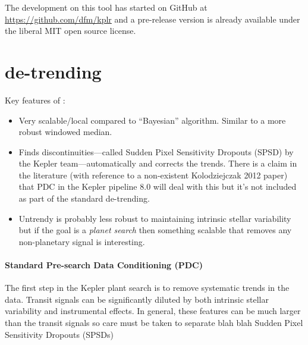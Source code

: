 \documentclass[letterpaper,12pt,preprint]{hack_aastex}
\begin{document}
The development on this tool has started on GitHub at
\url{https://github.com/dfm/kplr} and a pre-release version is already
available under the liberal MIT open source license.


\section{de-trending}

Key features of :
\begin{itemize}
\item Very scalable/local compared to ``Bayesian'' algorithm. Similar to
      a more robust windowed median.
\item Finds discontinuities---called Sudden Pixel Sensitivity Dropouts (SPSD)
      by the Kepler team---automatically and corrects the trends. There is a
      claim in the literature (with reference to a non-existent
      Kolodziejczak 2012 paper) that PDC in the Kepler pipeline 8.0 will deal
      with this but it's not included as part of the standard de-trending.
\item Untrendy is probably less robust to maintaining intrinsic stellar
      variability but if the goal is a \emph{planet search} then something
      scalable that removes any non-planetary signal is interesting.
\end{itemize}

\paragraph{Standard Pre-search Data Conditioning (PDC)}
The first step in the Kepler plant search is to remove systematic trends in
the data.
Transit signals can be significantly diluted by both intrinsic stellar
variability and instrumental effects. In general, these features can be much
larger than the transit signals so care must be taken to separate
blah blah Sudden Pixel Sensitivity Dropouts (SPSDs)
\end{document}
